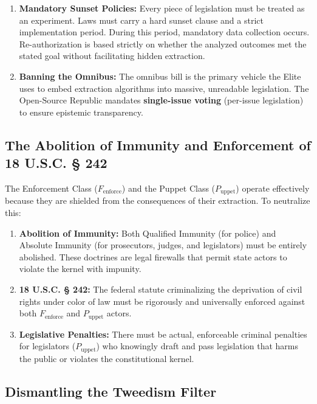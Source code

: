 \begin{enumerate}
    \item \textbf{Mandatory Sunset Policies:} Every piece of legislation must be treated as an experiment. Laws must carry a hard sunset clause and a strict implementation period. During this period, mandatory data collection occurs. Re-authorization is based strictly on whether the analyzed outcomes met the stated goal without facilitating hidden extraction.
    \item \textbf{Banning the Omnibus:} The omnibus bill is the primary vehicle the Elite uses to embed extraction algorithms into massive, unreadable legislation. The Open-Source Republic mandates \textbf{single-issue voting} (per-issue legislation) to ensure epistemic transparency.
\end{enumerate}

\subsection{The Abolition of Immunity and Enforcement of 18 U.S.C. § 242}

The Enforcement Class ($F_{\text{enforce}}$) and the Puppet Class ($P_{\text{uppet}}$) operate effectively because they are shielded from the consequences of their extraction. To neutralize this:

\begin{enumerate}
    \item \textbf{Abolition of Immunity:} Both Qualified Immunity (for police) and Absolute Immunity (for prosecutors, judges, and legislators) must be entirely abolished. These doctrines are legal firewalls that permit state actors to violate the kernel with impunity. 
    \item \textbf{18 U.S.C. § 242:} The federal statute criminalizing the deprivation of civil rights under color of law must be rigorously and universally enforced against both $F_{\text{enforce}}$ and $P_{\text{uppet}}$ actors.
    \item \textbf{Legislative Penalties:} There must be actual, enforceable criminal penalties for legislators ($P_{\text{uppet}}$) who knowingly draft and pass legislation that harms the public or violates the constitutional kernel. 
\end{enumerate}

\subsection{Dismantling the Tweedism Filter}

